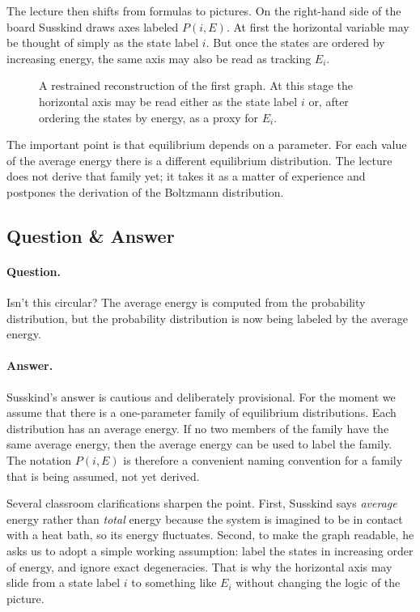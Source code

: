 The lecture then shifts from formulas to pictures. On the right-hand side of the board Susskind draws axes labeled \(P(i,E)\). At first the horizontal variable may be thought of simply as the state label \(i\). But once the states are ordered by increasing energy, the same axis may also be read as tracking \(E_i\).

\begin{figure}[t]
\centering
{}
\caption{A restrained reconstruction of the first graph. At this stage the horizontal axis may be read either as the state label \(i\) or, after ordering the states by energy, as a proxy for \(E_i\).}
\end{figure}

The important point is that equilibrium depends on a parameter. For each value of the average energy there is a different equilibrium distribution. The lecture does not derive that family yet; it takes it as a matter of experience and postpones the derivation of the Boltzmann distribution.

\subsection{Question \& Answer}

\paragraph{Question.} Isn't this circular? The average energy is computed from the probability distribution, but the probability distribution is now being labeled by the average energy.

\paragraph{Answer.} Susskind's answer is cautious and deliberately provisional. For the moment we assume that there is a one-parameter family of equilibrium distributions. Each distribution has an average energy. If no two members of the family have the same average energy, then the average energy can be used to label the family. The notation \(P(i,E)\) is therefore a convenient naming convention for a family that is being assumed, not yet derived.

Several classroom clarifications sharpen the point. First, Susskind says \emph{average} energy rather than \emph{total} energy because the system is imagined to be in contact with a heat bath, so its energy fluctuates. Second, to make the graph readable, he asks us to adopt a simple working assumption: label the states in increasing order of energy, and ignore exact degeneracies. That is why the horizontal axis may slide from a state label \(i\) to something like \(E_i\) without changing the logic of the picture.

